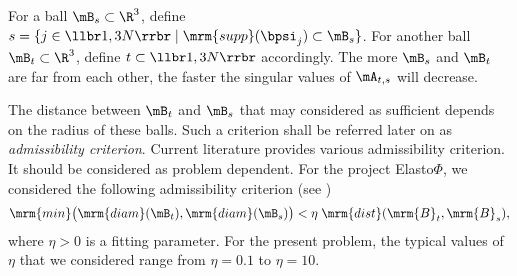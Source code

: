 For a ball $\mB_{s}\subset \R^{3}$, define $s = \{j \in\llbr 1,3N\rrbr\;\vert \;\mrm{supp}(\bpsi_{j})\subset \mB_{s}\}$. 
For another ball $\mB_{t}\subset \R^{3}$, define $t\subset \llbr1,3N\rrbr$ accordingly.  
The more $\mB_{s}$ and $\mB_{t}$ are far from each other, the faster the singular values of $\mA_{t,s}$ will decrease. 

The distance between $\mB_{t}$ and $\mB_{s}$ that may considered as sufficient depends on the radius of these balls. 
Such a criterion shall be referred later on as \textit{admissibility criterion}. Current literature provides various 
admissibility criterion. It should be considered as problem dependent. For the project Elasto$\Phi$, we considered the 
following admissibility criterion (see \cite{Rjasanow2007})
\begin{equation}\label{AdmissibilityCondition}
\mrm{min}\big( \mrm{diam}(\mB_{t}),\mrm{diam}(\mB_{s})\big)< \eta\;\mrm{dist}(\mrm{B}_{t},\mrm{B}_{s}),
\end{equation}
where $\eta>0$ is a fitting parameter. For the present problem, the typical values of $\eta$ that we considered  
range from $\eta = 0.1$ to $\eta = 10$.






